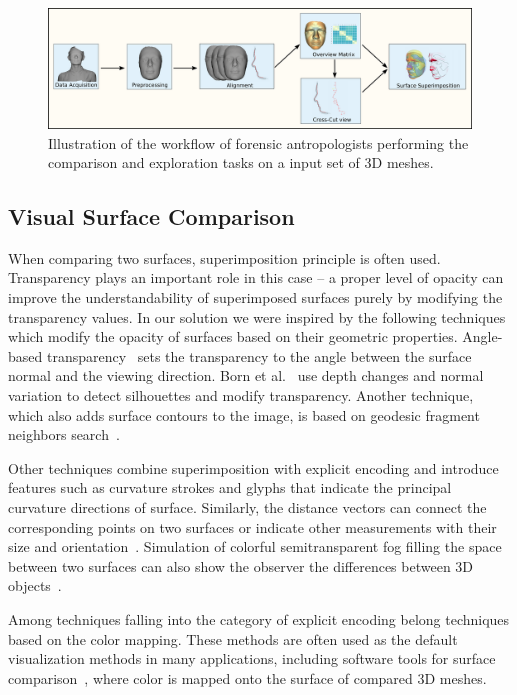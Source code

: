 \documentclass[final,5p,times]{elsarticle}
\begin{document}
\begin{figure}[tbh]
	\centering
  \includegraphics[width=1\linewidth]{pictures/pipeline1.png}
  \caption{\label{fig:pipeline} Illustration of the workflow of forensic antropologists performing the comparison and exploration tasks on a input set of 3D meshes.}
	\vspace{-2mm}
\end{figure}


\subsection{Visual Surface Comparison}
When comparing two surfaces, superimposition principle is often used.
Transparency plays an important role in this case -- a proper level of opacity can improve the understandability of superimposed surfaces purely by modifying the transparency values. 
In our solution we were inspired by the following techniques which modify the opacity of surfaces based on their geometric properties. 
Angle-based transparency~\cite{hummel2010iris} sets the transparency to the angle between the surface normal and the viewing direction. 
Born et al.~\cite{born2009illustrative} use depth changes and normal variation to detect silhouettes and modify transparency. 
Another technique, which also adds surface contours to the image, is based on geodesic fragment neighbors search~\cite{carnecky2013smart}. 

Other techniques \cite{interrante1997conveying,diewald2000anisotropic,weigle2005visualizing} combine superimposition with explicit encoding and introduce features such as curvature strokes and glyphs that indicate the principal curvature directions of surface.
Similarly, the distance vectors can connect the corresponding points on two surfaces or indicate other measurements with their size and orientation~\cite{busking2011image}. 
Simulation of colorful semitransparent fog filling the space between two surfaces can also show the observer the differences between 3D objects~\cite{busking2011image}.

Among techniques falling into the category of explicit encoding belong techniques based on the color mapping. 
These methods are often used as the default visualization methods in many applications, including software tools for surface comparison~\cite{CCompare,ymca}, where color is mapped onto the surface of compared 3D meshes. 
\end{document}
